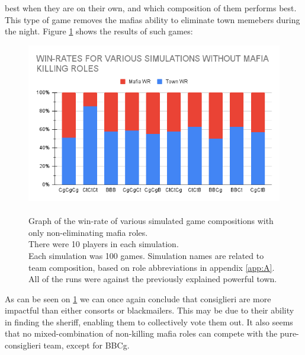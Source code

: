 best when they are on their own, and which composition of them performs best.
This type of game removes the mafias ability to eliminate town memebers during the night. 
Figure \ref{fig:VariousSimulationsNonKilling} shows the results of such games:
\begin{figure}[H]
    \includegraphics[width=1\linewidth]{figures/Winrates_NonKilling}
    \caption{\\Graph of the win-rate of various simulated game compositions
        with only non-eliminating mafia roles.\\
        There were 10 players in each simulation.\\
        Each simulation was 100 games.
        Simulation names are related to team composition, based on role
        abbreviations in appendix \ref{app:A}.\\
        All of the runs were against the previously explained powerful town.}
    \label{fig:VariousSimulationsNonKilling}
\end{figure}
\vspace{-5px} As can be seen on \cref{fig:VariousSimulationsNonKilling} we can once again conclude that
consiglieri are more impactful than either consorts or blackmailers. This may
be due to their ability in finding the sheriff, enabling them to
collectively vote them out. It also seems that no mixed-combination of
non-killing mafia roles can compete with the pure-consiglieri team, except for BBCg.
